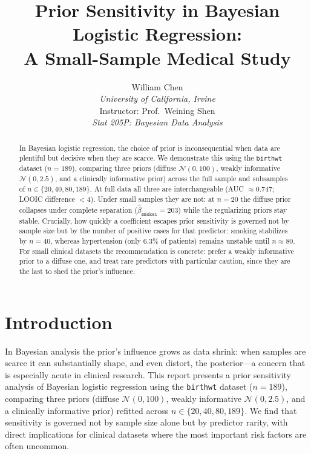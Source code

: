 \documentclass[11pt]{article}
\title{\textbf{Prior Sensitivity in Bayesian Logistic Regression:\\
A Small-Sample Medical Study}}
\author{
    William Chen\\
    \textit{University of California, Irvine}\\
    Instructor: Prof.\ Weining Shen\\
    \textit{Stat 205P: Bayesian Data Analysis}
}
\date{}
\begin{document}
\maketitle

\begin{abstract}
In Bayesian logistic regression, the choice of prior is
inconsequential when data are plentiful but decisive when they are
scarce.
We demonstrate this using the \texttt{birthwt} dataset ($n = 189$),
comparing three priors (diffuse $\mathcal{N}(0, 100)$, weakly
informative $\mathcal{N}(0, 2.5)$, and a clinically informative prior)
across the full sample and subsamples of $n \in \{20, 40, 80, 189\}$.
At full data all three are interchangeable (AUC $\approx 0.747$; LOOIC difference $< 4$).
Under small samples they are not: at $n = 20$ the diffuse prior
collapses under complete separation
($\hat{\beta}_{\texttt{smoke1}} = 203$) while the regularizing priors
stay stable.
Crucially, how quickly a coefficient escapes prior sensitivity is
governed not by sample size but by the number of positive cases for
that predictor: smoking stabilizes by $n = 40$, whereas hypertension
(only 6.3\% of patients) remains unstable until $n \approx 80$.
For small clinical datasets the recommendation is concrete: prefer
a weakly informative prior to a diffuse one, and treat rare predictors
with particular caution, since they are the last to shed the prior's
influence.
\end{abstract}

\section{Introduction}

In Bayesian analysis the prior's influence grows as data shrink: when
samples are scarce it can substantially shape, and even distort, the
posterior---a concern that is especially acute in clinical research.
This report presents a prior sensitivity analysis of Bayesian logistic
regression using the \texttt{birthwt} dataset ($n = 189$), comparing
three priors (diffuse $\mathcal{N}(0,100)$, weakly informative
$\mathcal{N}(0,2.5)$, and a clinically informative prior) refitted
across $n \in \{20, 40, 80, 189\}$.
We find that sensitivity is governed not by sample size alone but by
predictor rarity, with direct implications for clinical datasets where
the most important risk factors are often uncommon.
\end{document}
